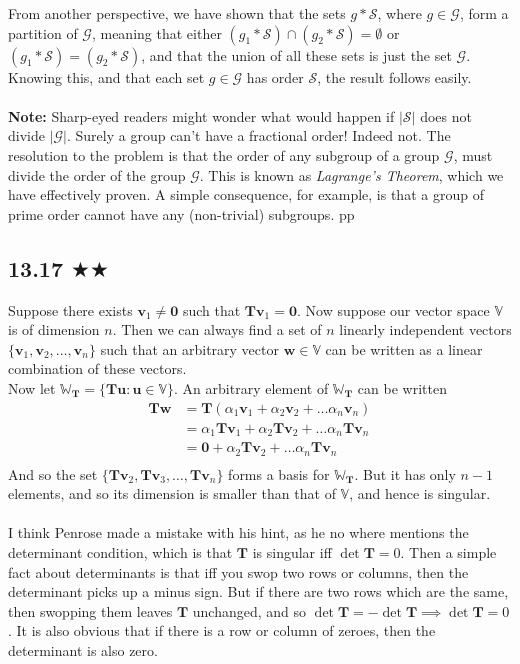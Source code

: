 From another perspective, we have shown that the sets $g*\mathcal{S}$, where $g\in \mathcal{G}$, form a partition of $\mathcal{G}$, meaning that either $(g_1*\mathcal{S})\cap (g_2*\mathcal{S})=\emptyset$ or $(g_1*\mathcal{S})= (g_2*\mathcal{S})$, and that the union of all these sets is just the set $\mathcal{G}$. Knowing this, and that each set $g\in \mathcal{G}$ has order $\mathcal{S}$, the result follows easily.   \\ \\ \textbf{Note:} Sharp-eyed readers might wonder what would happen if $|\mathcal{S}|$ does not divide $|\mathcal{G}|$. Surely a group can't have a fractional order! Indeed not. The resolution to the problem is that the order of any subgroup of a group $\mathcal{G}$, must divide the order of the group $\mathcal{G}$. This is known as \emph{Lagrange's Theorem}, which we have effectively proven. A simple consequence, for example, is that a group of prime order cannot have any (non-trivial) subgroups. pp


\subsection{13.17 $\bigstar \bigstar $}
Suppose there exists $\mathbf{v}_1\neq \mathbf{0}$ such that $\mathbf{T}\mathbf{v}_1=\mathbf{0}$. Now suppose our vector space $\mathbb{V}$ is of dimension $n$. Then we can always find a set of $n$ linearly independent vectors $\{\mathbf{v}_1,\mathbf{v}_2,\ldots,\mathbf{v}_n\}$ such that an arbitrary vector $\mathbf{w}\in\mathbb{V}$ can be written as a linear combination of these vectors.\\ Now let $\mathbb{W}_{\mathbf{T}}=\{\mathbf{T}\mathbf{u}:\mathbf{u}\in \mathbb{V}\}$. An arbitrary element of $\mathbb{W}_{\mathbf{T}}$ can be written
\begin{align*}
\mathbf{T}\mathbf{w}&=\mathbf{T}(\alpha_1 \mathbf{v}_1+\alpha_2 \mathbf{v}_2+\ldots \alpha_n \mathbf{v}_n)\\
&=\alpha_1 \mathbf{T}\mathbf{v}_1+\alpha_2 \mathbf{T}\mathbf{v}_2+\ldots \alpha_n \mathbf{T}\mathbf{v}_n\\
&=\mathbf{0}+\alpha_2 \mathbf{T}\mathbf{v}_2+\ldots \alpha_n \mathbf{T}\mathbf{v}_n\\
\end{align*} 
And so the set $\{\mathbf{T}\mathbf{v}_2,\mathbf{T}\mathbf{v}_3,\ldots  ,\mathbf{T}\mathbf{v}_n\}$ forms a basis for $\mathbb{W}_{\mathbf{T}}$. But it has only $n-1$ elements, and so its dimension is smaller than that of $\mathbb{V}$, and hence is singular.\\ \\ I think Penrose made a mistake with his hint, as he no where mentions the determinant condition, which is that $\mathbf{T}$ is singular iff $\det \mathbf{T}=0$. Then a simple fact about determinants is that iff you swop two rows or columns, then the determinant picks up a minus sign. But if there are two rows which are the same, then swopping them leaves $\mathbf{T}$ unchanged, and so $\det \mathbf{T}=-\det\mathbf{T}\implies \det \mathbf{T}=0$. It is also obvious that if there is a row or column of zeroes, then the determinant is also zero.


